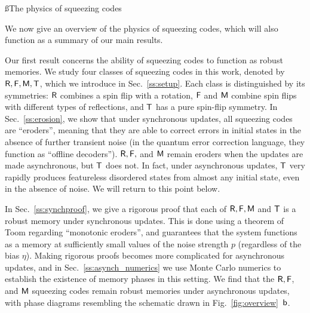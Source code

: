 \documentclass[pra,aps,twocolumn,groupedaddress,superscriptaddress,nofootinbib,preprintnumbers]{revtex4-2}
\begin{document}
	\ss{The physics of squeezing codes}
	
	We now give an overview of the physics of squeezing codes, which will also function as a summary of our main results. 
	
	
	Our first result concerns the ability of squeezing codes to function as robust memories. We study four classes of squeezing codes in this work, denoted by $\mathsf{R},\mathsf{F},\mathsf{M},\mathsf{T}$, which we introduce in Sec.~\ref{ss:setup}. Each class is distinguished by its symmetries: $\mathsf{R}$ combines a spin flip with a rotation, $\mathsf{F}$ and $\mathsf{M}$ combine spin flips with different types of reflections, and $\mathsf{T}$ has a pure spin-flip symmetry. In Sec.~\ref{ss:erosion}, we show that under synchronous updates, all squeezing codes are ``eroders'', meaning that they are able to correct errors in initial states in the absence of further transient noise (in the quantum error correction language, they function as ``offline decoders''). $\mathsf{R},\mathsf{F},$ and $\mathsf{M}$ remain eroders when the updates are made asynchronous, but $\mathsf{T}$ does not. In fact, under asynchronous updates, $\mathsf{T}$ very rapidly produces featureless disordered states from almost any initial state, even in the absence of noise. We will return to this point below. 
	
	In Sec.~\ref{ss:synchproof}, we give a rigorous proof that each of $\mathsf{R},\mathsf{F},\mathsf{M}$ and $\mathsf{T}$ is a robust memory under synchronous updates. This is done using a theorem of Toom \cite{toom1980stable} regarding ``monotonic eroders'', and guarantees that the system functions as a memory at sufficiently small values of the noise strength $p$ (regardless of the bias $\eta$). 
	Making rigorous proofs becomes more complicated for asynchronous updates, and in Sec.~\ref{ss:asynch_numerics} we use Monte Carlo numerics to establish the existence of memory phases in this setting. We find that the  $\mathsf{R},\mathsf{F}$, and $\mathsf{M}$ squeezing codes remain robust memories under asynchronous updates, with phase diagrams resembling the schematic drawn in Fig.~\ref{fig:overview}~$\mathsf{b}$. 
\end{document}
